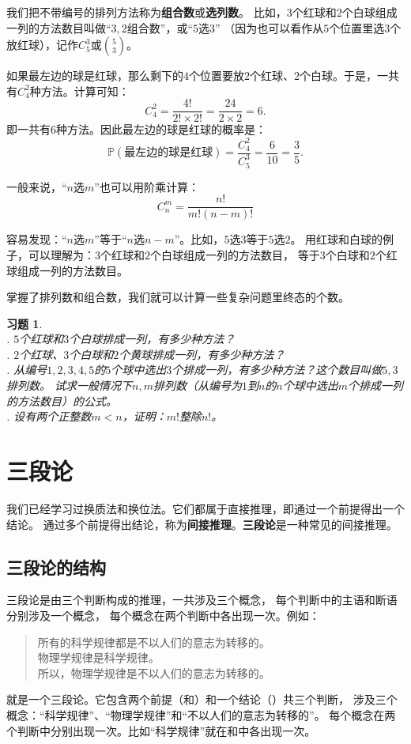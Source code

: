\documentclass[12pt,UTF8]{ctexbook}
\newtheorem{xt}{习题}[section]
\begin{document}
我们把不带编号的排列方法称为\textbf{组合数}或\textbf{选列数}。
比如，$3$个红球和$2$个白球组成一列的方法数目叫做“$3,2$组合数”，或“$5$选$3$”
（因为也可以看作从$5$个位置里选$3$个放红球），记作$C_5^3$或$5 \choose 3$。

如果最左边的球是红球，那么剩下的$4$个位置要放$2$个红球、$2$个白球。于是，一共有$C_4^2$种方法。计算可知：
$$ C_4^2 = \frac{4!}{2!\times 2!} = \frac{24}{2\times 2} = 6.$$
即一共有$6$种方法。因此最左边的球是红球的概率是：
$$ \mathbb{P}(\mbox{最左边的球是红球}) = \frac{C_4^2}{C_5^3} = \frac{6}{10} = \frac{3}{5}.$$

一般来说，“$n$选$m$”也可以用阶乘计算：
$$ C_n^m = \frac{n!}{m!(n-m)!} $$

容易发现：“$n$选$m$”等于“$n$选$n-m$”。比如，$5$选$3$等于$5$选$2$。
用红球和白球的例子，可以理解为：$3$个红球和$2$个白球组成一列的方法数目，
等于$3$个白球和$2$个红球组成一列的方法数目。

掌握了排列数和组合数，我们就可以计算一些复杂问题里终态的个数。

\begin{xt}
    \mbox{} \\
    . $5$个红球和$3$个白球排成一列，有多少种方法？\\
    . $2$个红球、$3$个白球和$2$个黄球排成一列，有多少种方法？\\
    . 从编号$1,2,3,4,5$的$5$个球中选出$3$个排成一列，有多少种方法？这个数目叫做$5,3$排列数。
    试求一般情况下$n,m$排列数（从编号为$1$到$n$的$n$个球中选出$m$个排成一列的方法数目）的公式。\\
    . 设有两个正整数$m < n$，证明：$m!$整除$n!$。
\end{xt}

\chapter{三段论}

我们已经学习过换质法和换位法。它们都属于直接推理，即通过一个前提得出一个结论。
通过多个前提得出结论，称为\textbf{间接推理}。\textbf{三段论}是一种常见的间接推理。

\section{三段论的结构}
三段论是由三个判断构成的推理，一共涉及三个概念，
每个判断中的主语和断语分别涉及一个概念，
每个概念在两个判断中各出现一次。例如：
\begin{quotation}
    \noindent {}所有的科学规律都是不以人们的意志为转移的。\\
    物理学规律是科学规律。\\
    所以，物理学规律是不以人们的意志为转移的。
\end{quotation}
就是一个三段论。它包含两个前提（和）和一个结论（）共三个判断，
涉及三个概念：“科学规律”、“物理学规律”和“不以人们的意志为转移的”。
每个概念在两个判断中分别出现一次。比如“科学规律”就在和中各出现一次。
\end{document}
